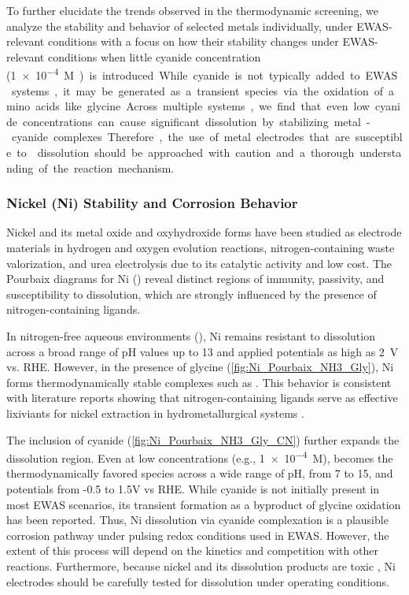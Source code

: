 \documentclass[journal=jacsat,manuscript=article]{achemso}
\begin{document}
To further elucidate the trends observed in the thermodynamic screening, we analyze the stability and behavior of selected metals individually, under EWAS-relevant conditions with a focus on how their stability changes under EWAS-relevant conditions when little cyanide concentration (\SI{1e-4}M) is introduced. While cyanide is not typically added to EWAS systems, it may be generated as a transient species via the oxidation of amino acids like glycine. Across multiple systems, we find that even low cyanide concentrations can cause significant dissolution by stabilizing metal-cyanide complexes. Therefore, the use of metal electrodes that are susceptible to  dissolution should be approached with caution and a thorough understanding of the reaction mechanism.


\subsubsection{Nickel (Ni) Stability and Corrosion Behavior}
Nickel and its metal oxide and oxyhydroxide forms have been studied as electrode materials in hydrogen and oxygen evolution reactions, nitrogen-containing waste valorization, and urea electrolysis \cite{Wang2014InCatalysts, Yan2012NickelElectro-oxidation, Vedharathinam2012UnderstandingMedium, Coyle2025NovelCarbon, JafariElectrochemicalProduction, LiraGarciaBarros2025ImpactElectrolyzer, Wang2020Non-precious-metalAdvances} due to its catalytic activity and low cost. The Pourbaix diagrams for Ni () reveal distinct regions of immunity, passivity, and susceptibility to dissolution, which are strongly influenced by the presence of nitrogen-containing ligands. 

In nitrogen-free aqueous environments (), Ni remains resistant to dissolution across a broad range of pH values up to 13 and applied potentials as high as 2~V vs. RHE. However, in the presence of glycine (\ref{fig:Ni_Pourbaix_NH3_Gly}), Ni forms thermodynamically stable complexes such as \ce{[Ni(Gly)_3]^{-}}. This behavior is consistent with literature reports showing that nitrogen-containing ligands serve as effective lixiviants for nickel extraction in hydrometallurgical systems \cite{Meng1996PrinciplesReview, Yao2021SelectivePhosphide, Ma2021ALeaching}. 

The inclusion of cyanide (\ref{fig:Ni_Pourbaix_NH3_Gly_CN}) further expands the dissolution region. Even at low concentrations (e.g., \num{1e-4}~M),  becomes the thermodynamically favored species across a wide range of pH, from 7 to 15, and potentials from -0.5 to 1.5V vs RHE. While cyanide is not initially present in most EWAS scenarios, its transient formation as a byproduct of glycine oxidation has been reported. Thus, Ni dissolution via cyanide complexation is a plausible corrosion pathway under pulsing redox conditions used in EWAS. However, the extent of this process will depend on the kinetics and competition with other reactions. Furthermore, because nickel and its dissolution products are toxic \cite{Bhattacharya2009CyanideTreatment}, Ni electrodes should be carefully tested for dissolution under operating conditions.
\end{document}
